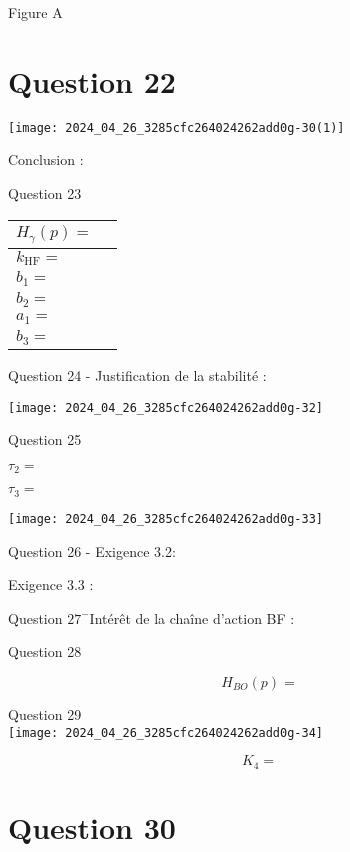 Figure A

\section*{Question 22}
\begin{center}
\texttt{[image: 2024\_04\_26\_3285cfc264024262add0g-30(1)]}
\end{center}

Conclusion :

Question 23

\begin{center}
\begin{tabular}{|l|l|}
\hline
$H_{\gamma}(p)=$ \\
\hline
$k_{\mathrm{HF}}=$ \\
\hline
$b_{1}=$ \\
\hline
$b_{2}=$ \\
\hline
$a_{1}=$ \\
\hline
$b_{3}=$ \\
\hline
\end{tabular}
\end{center}

Question 24 - Justification de la stabilité :

\begin{center}
\texttt{[image: 2024\_04\_26\_3285cfc264024262add0g-32]}
\end{center}

Question 25

$\tau_{2}=$

$\tau_{3}=$

\begin{center}
\texttt{[image: 2024\_04\_26\_3285cfc264024262add0g-33]}
\end{center}

Question 26 - Exigence 3.2:

Exigence 3.3 :

Question $27^{-}$Intérêt de la chaîne d'action BF :

Question 28

$$
H_{B O}(p)=
$$

Question 29\\
\texttt{[image: 2024\_04\_26\_3285cfc264024262add0g-34]}

$$
K_{4}=
$$

\section*{Question 30}

